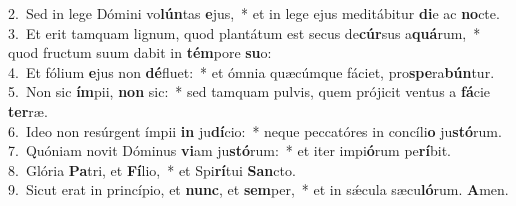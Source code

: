 {2.~}Sed in lege Dómini vo\textbf{lún}tas \textbf{e}jus,~* et in lege ejus meditábitur \textbf{di}e ac \textbf{no}cte.\\
{3.~}Et erit tamquam lignum, quod plantátum est secus de\textbf{cúr}sus a\textbf{quá}rum,~* quod fructum suum dabit in \textbf{tém}pore \textbf{su}o:\\
{4.~}Et fólium \textbf{e}jus non \textbf{dé}fluet:~* et ómnia quæcúmque fáciet, pro\textbf{spe}ra\textbf{bún}tur.\\
{5.~}Non sic \textbf{ím}pii, \textbf{non} sic:~* sed tamquam pulvis, quem prójicit ventus a \textbf{fá}cie \textbf{ter}ræ.\\
{6.~}Ideo non resúrgent ímpii \textbf{in} ju\textbf{dí}cio:~* neque peccatóres in concíli\textbf{o} ju\textbf{stó}rum.\\
{7.~}Quóniam novit Dóminus \textbf{vi}am ju\textbf{stó}rum:~* et iter impi\textbf{ó}rum pe\textbf{rí}bit.\\
{8.~}Glória \textbf{Pa}tri, et \textbf{Fí}lio,~* et Spi\textbf{rí}tui \textbf{San}cto.\\
{9.~}Sicut erat in princípio, et \textbf{nunc}, et \textbf{sem}per,~* et in sǽcula sæcu\textbf{ló}rum. \textbf{A}men.\\
